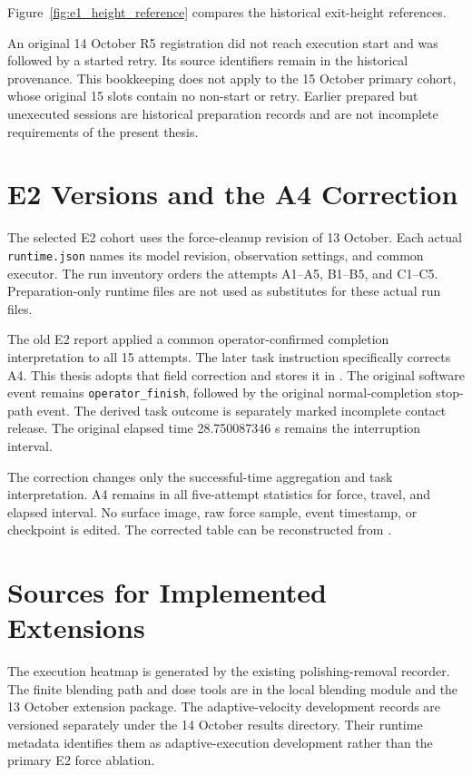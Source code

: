 Figure~\ref{fig:e1_height_reference} compares the historical exit-height references.


An original 14 October R5 registration did not reach execution start and was followed by a started retry. Its source identifiers remain in the historical provenance. This bookkeeping does not apply to the 15 October primary cohort, whose original 15 slots contain no non-start or retry. Earlier prepared but unexecuted sessions are historical preparation records and are not incomplete requirements of the present thesis.

\section{E2 Versions and the A4 Correction}
The selected E2 cohort uses the force-cleanup revision of 13 October. Each actual \texttt{runtime.json} names its model revision, observation settings, and common executor. The run inventory orders the attempts A1--A5, B1--B5, and C1--C5. Preparation-only runtime files are not used as substitutes for these actual run files.

The old E2 report applied a common operator-confirmed completion interpretation to all 15 attempts. The later task instruction specifically corrects A4. This thesis adopts that field correction and stores it in . The original software event remains \texttt{operator\_finish}, followed by the original normal-completion stop-path event. The derived task outcome is separately marked incomplete contact release. The original elapsed time 28.750087346 s remains the interruption interval.

The correction changes only the successful-time aggregation and task interpretation. A4 remains in all five-attempt statistics for force, travel, and elapsed interval. No surface image, raw force sample, event timestamp, or checkpoint is edited. The corrected table can be reconstructed from .

\section{Sources for Implemented Extensions}
The execution heatmap is generated by the existing polishing-removal recorder. The finite blending path and dose tools are in the local blending module and the 13 October extension package. The adaptive-velocity development records are versioned separately under the 14 October results directory. Their runtime metadata identifies them as adaptive-execution development rather than the primary E2 force ablation.

